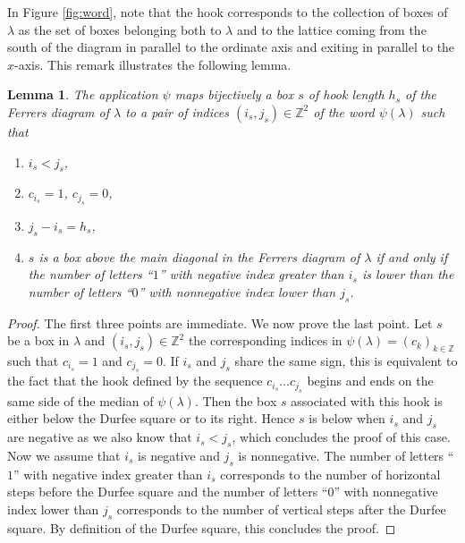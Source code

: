 \documentclass[11pt,letterpaper]{amsart}
\def\bbbz{\mathbb Z}
\newtheorem{lm}[df]{Lemma}
\numberwithin{equation}{section}
\numberwithin{df}{section}
\begin{document}
In Figure \ref{fig:word}, note that the hook corresponds to the collection of boxes of $\lambda$ as the set of boxes belonging both to $\lambda$ and to the lattice coming from the south of the diagram in parallel to the ordinate axis and exiting in parallel to the $x$-axis. This remark illustrates the following lemma.
\begin{lm}\label{lem:indices}
The application $\psi$ maps bijectively a box $s$ of hook length $h_s$ of the Ferrers diagram of $\lambda$ to a pair of indices $(i_s,j_s)\in\bbbz^2$ of the word $\psi(\lambda)$ such that
\begin{enumerate}
\item $i_s<j_s$,
\item $c_{i_s}=1$, $c_{j_s}=0$,
\item $j_s-i_s=h_s$,
\item $s$ is a box above the main diagonal in the Ferrers diagram of $\lambda$ if and only if the number of letters ``$1$'' with negative index greater than $i_s$ is lower than the number of letters ``$0$'' with nonnegative index lower than $j_s$.
\end{enumerate}
\end{lm}  
\begin{proof}
The first three points are immediate. We now prove the last point. 
Let $s$ be a box in $\lambda$ and $(i_s,j_s)\in\bbbz^2$ the corresponding indices in $\psi(\lambda)=(c_k)_{k\in\bbbz}$ such that $c_{i_s}=1$ and $c_{j_s}=0$. If $i_s$ and $j_s$ share the same sign, this is equivalent to the fact that the hook defined by the sequence $c_{i_s}\dots c_{j_s}$ begins and ends on the same side of the median of $\psi(\lambda)$.
Then the box $s$ associated with this hook is either below the Durfee square or to its right. Hence $s$ is below when $i_s$ and $j_s$ are negative as we also know that $i_s<j_s$, which concludes the proof of this case. Now we assume that $i_s$ is negative and $j_s$ is nonnegative. The number of letters ``$1$'' with negative index greater than $i_s$ corresponds to the number of horizontal steps before the Durfee square and the number of letters ``$0$'' with nonnegative index lower than $j_s$ corresponds to the number of vertical steps after the Durfee square. By definition of the Durfee square, this concludes the proof.
\end{proof}

\end{document}
